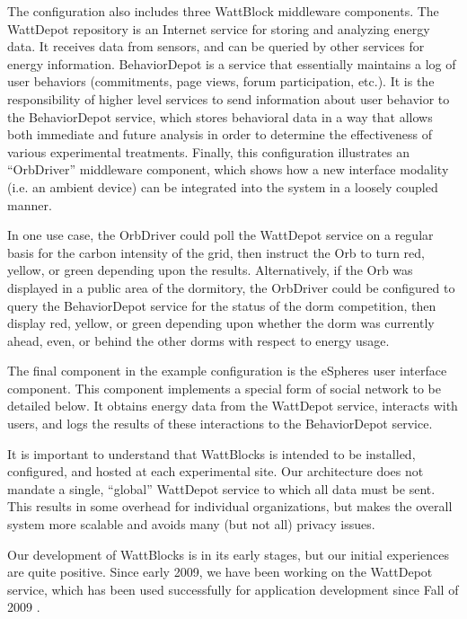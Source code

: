 The configuration also includes three WattBlock middleware components.  The
WattDepot repository is an Internet service for storing and analyzing
energy data.  It receives data from sensors, and can be queried by other
services for energy information.  BehaviorDepot is a service that
essentially maintains a log of user behaviors (commitments, page views,
forum participation, etc.).  It is the responsibility of higher level
services to send information about user behavior to the BehaviorDepot
service, which stores behavioral data in a way that allows both immediate
and future analysis in order to determine the effectiveness of various
experimental treatments.  Finally, this configuration illustrates an
``OrbDriver'' middleware component, which shows how a new interface
modality (i.e. an ambient device) can be integrated into the system in a
loosely coupled manner.

In one use case,  the OrbDriver could poll the WattDepot service on a regular
basis for the carbon intensity of the grid, then instruct the Orb to turn
red, yellow, or green depending upon the results. Alternatively, if the Orb
was displayed in a public area of the dormitory, the OrbDriver could be
configured to query the BehaviorDepot service for the status of the dorm
competition, then display red, yellow, or green depending upon whether the
dorm was currently ahead, even, or behind the other dorms with respect to
energy usage.

The final component in the example configuration is the eSpheres user
interface component.  This component implements a special form of social
network to be detailed below. It obtains energy data from the WattDepot service,
interacts with users, and logs the results of these interactions to the
BehaviorDepot service.

It is important to understand that WattBlocks is intended to be installed,
configured, and hosted at each experimental site.  Our architecture does
not mandate a single, ``global'' WattDepot service to which all data
must be sent.  This results in some overhead for
individual organizations, but makes the overall system more scalable and
avoids many (but not all) privacy issues.



Our development of WattBlocks is in its early stages, but our initial
experiences are quite positive.  Since early 2009, we have been working on
the WattDepot service, which has been used successfully for application
development since Fall of 2009 \cite{WattDepot}.  

